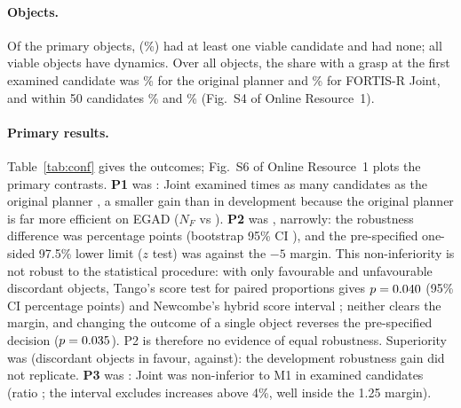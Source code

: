 \paragraph{Objects.} Of the \confObjects{} primary objects, \confViable{} (\confViableShare\%) had at least one viable candidate and \confNonViable{} had none; all \confViable{} viable objects have dynamics. Over all \confObjects{} objects, the share with a grasp at the first examined candidate was \confSoneMzero\% for the original planner and \confSoneJoint\% for FORTIS-R Joint, and within 50 candidates \confSfiftyMzero\% and \confSfiftyJoint\% (Fig.~S4 of Online Resource~1).

\paragraph{Primary results.} Table~\ref{tab:conf} gives the outcomes; Fig.~S6 of Online Resource~1 plots the primary contrasts. \textbf{P1} was \confPoneVerdict: Joint examined \confPoneRatio{} times as many candidates as the original planner \confPoneCI, a smaller gain than in development because the original planner is far more efficient on EGAD ($N_F$ \confNFMzero{} vs \devNFMzero). \textbf{P2} was \confPtwoVerdict, narrowly: the robustness difference was \confPtwoDiff{} percentage points (bootstrap 95\% CI \confPtwoCI), and the pre-specified one-sided 97.5\% lower limit ($z$ test) was \confPtwoLower{} against the $-5$ margin. This non-inferiority is not robust to the statistical procedure: with only \auditDiscFav{} favourable and \auditDiscUnfav{} unfavourable discordant objects, Tango's score test for paired proportions \cite{tango1998} gives $p=0.040$ (95\% CI \auditTangoCI{} percentage points) and Newcombe's hybrid score interval \cite{newcombe1998paired} \auditNewcombeCI; neither clears the margin, and changing the outcome of a single object reverses the pre-specified decision ($p=0.035$). P2 is therefore no evidence of equal robustness. Superiority was \confPtwoSupVerdict{} (discordant objects \confPtwoSupFav{} in favour, \confPtwoSupUnfav{} against): the development robustness gain did not replicate. \textbf{P3} was \confPthreeVerdict: Joint was non-inferior to M1 in examined candidates (ratio \confPthreeRatio{} \confPthreeCI; the interval excludes increases above 4\%, well inside the 1.25 margin).

\begin{table}[t]
\caption{Primary confirmatory family on the EGAD primary set (\confViable{} viable objects). Effects: $N_F$ ratios or paired differences in percentage points, with 95\% bootstrap CIs; Holm-adjusted one-sided $p$; ``supported'' also requires the CI or bound criterion of the protocol.}\label{tab:conf}
\centering\scriptsize

\end{table}
